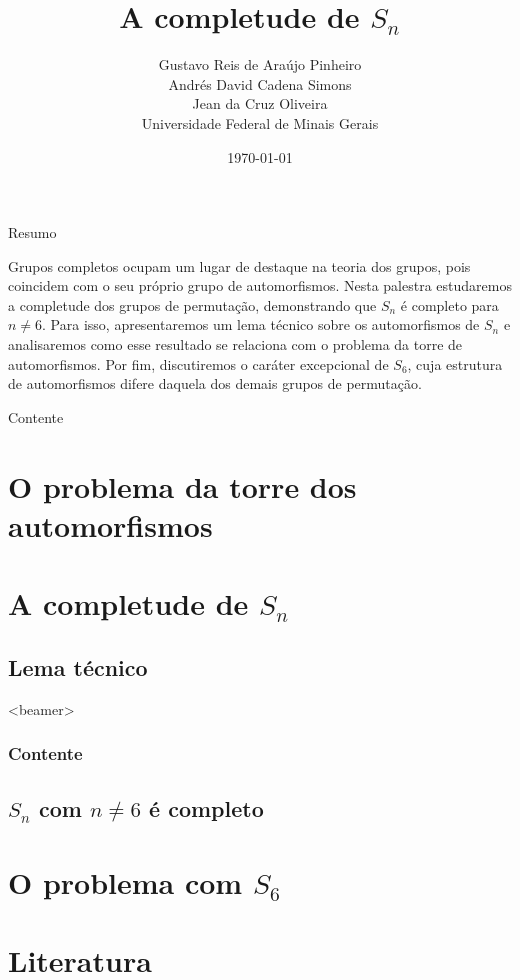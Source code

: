 \documentclass{beamer}
\title{A completude de $S_n$}
\author{\texorpdfstring{ 
Gustavo Reis de Araújo Pinheiro\\
Andrés David Cadena Simons\\
Jean da Cruz Oliveira\\
Universidade Federal de Minais Gerais}{A}}
\institute{ }
\date{\footnotesize \today}
\begin{document}
\begin{frame}
  \titlepage

\end{frame}

\begin{frame}{Resumo}
  \begin{block}{}
    Grupos completos ocupam um lugar de destaque na teoria dos grupos, pois coincidem com o seu próprio grupo de automorfismos. Nesta palestra estudaremos a completude dos grupos de permutação, demonstrando que $S_n$ é completo para $n\neq 6$. Para isso, apresentaremos um lema técnico sobre os automorfismos de $S_n$ e analisaremos como esse resultado se relaciona com o problema da torre de automorfismos. Por fim, discutiremos o caráter excepcional de $S_6$, cuja estrutura de automorfismos difere daquela dos demais grupos de permutação.
  \end{block}
\end{frame}

\begin{frame}{Contente}
  \tableofcontents
\end{frame}

\section{O problema da torre dos automorfismos}


\section{A completude de $S_n$}
\subsection{Lema técnico}


\begin{frame}<beamer>
  \frametitle{Contente}
  \tableofcontents[currentsection]
\end{frame}

\subsection{$S_n$ com $n\neq 6$ é completo}


\section{O problema com $S_6$}


\section{Literatura}
\end{document}
